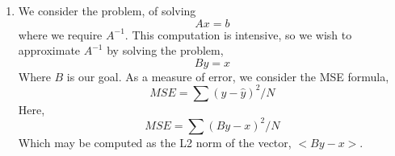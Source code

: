\documentclass[letterpaper,10pt]{article}
\begin{document}
\begin{enumerate}
\item We consider the problem, of solving
\[Ax=b\]
where we require $A^{-1}$. This computation is intensive, so we wish to approximate $A^{-1}$ by solving the problem,
\[By=x\]
Where $B$ is our goal. As a measure of error, we consider the MSE formula,
\[MSE=\sum(y-\hat{y})^2/N\]
Here,
\[MSE=\sum(By-x)^2/N\]
Which may be computed as the L2 norm of the vector, $<By-x>$.  
\end{enumerate}
\end{document}
